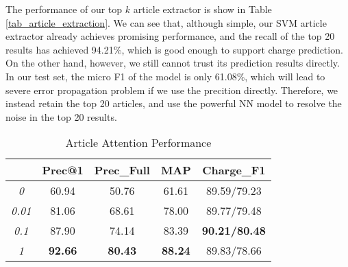 The performance of our top $k$ article extractor is show in Table \ref{tab_article_extraction}.
We can see that, although simple, our SVM article extractor already achieves promising performance, and the recall of the top 20 results has achieved 94.21\%, which is good enough to support charge prediction. 
On the other hand, however, we still cannot trust its prediction results directly.  In our test set, the micro F1 of the model is only 61.08\%, which will lead to severe error propagation problem if we use the precition directly. Therefore, we instead retain the top 20 articles, and use the powerful NN model to resolve the noise in the top 20 results.


\begin{table}
\centering
\normalsize{
\begin{tabular}{|c|c|c|c|c|}
\hline
\bm{$\beta$}			& \textbf{Prec@1} 			& \textbf{Prec\_Full} 			& \textbf{MAP} 			& \textbf{Charge\_F1} \\
\hline
\textit{0} 								& 60.94									& 50.76  									& 61.61 						& 89.59/79.23 	\\
\hline
\textit{0.01} 						& 81.06									& 68.61  									& 78.00							& 89.77/79.48 	\\
\hline
\textit{0.1} 							& 87.90									& 74.14  									& 83.39							& \textbf{90.21/80.48} 	\\
\hline
\textit{1} 								& \textbf{92.66}				& \textbf{80.43}  				& \textbf{88.24}		& 89.83/78.66 	\\
\hline
\end{tabular}
}
\caption{Article Attention Performance}
\label{tab_article_att}
\end{table}


